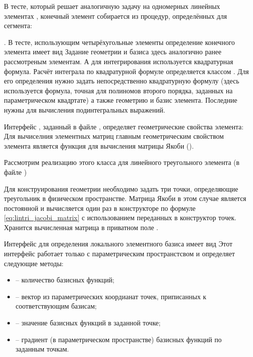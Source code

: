 В тесте, который решает аналогичную задачу на одномерных линейных элементах , конечный элемент
собирается из процедур, определённых для сегмента:

\label{sec:linear_quadrangle_assembly}.
В тесте, использующим четырёхугольные элементы 
определение конечного элемента имеет вид
Задание геометрии и базиса здесь аналогично ранее рассмотреным элементам.
А для интегрирования  используется квадратурная формула.
Расчёт интеграла по квадратурной формуле определяется классом
.
Для его определения нужно задать непосредственно квадратурную формулу
 (здесь используется формула, точная для полиномов второго порядка, заданных на параметрическом квадртате)
а также геометрию и базис элемента. Последние нужны для вычисления подинтегральных выражений.

Интерфейс , заданный в файле ,
определяет геометрические свойства элемента:
Для вычиселния элементных матриц главным геометрическим свойством
элемента является функция для вычисления матрицы Якоби ().

Рассмотрим реализацию этого класса для линейного треугольного элемента
(в файле )

Для конструирования геометрии необходимо
задать три точки, определяющие треугольник в физическом пространстве.
Матрица Якоби в этом случае является постоянной
и вычисляется один раз в конструкторе по формуле \cref{eq:lintri_jacobi_matrix} с использованием переданных в конструктор точек.
Хранится вычисленная матрица в приватном поле .

Интерфейс для определения локального элементного базиса имеет вид
Этот интерфейс работает только с параметрическим пространстсвом
и определяет следующие методы:
\begin{itemize}
\item {} -- количество базисных функций;
\item {} -- вектор из параметрических коордианат
      точек, приписанных к соответствующим базисам;
\item {} -- значение базисных функций в заданной точке;
\item {} -- градиент (в параметрическом пространстве) базисных функций по заданным точкам.
\end{itemize}

